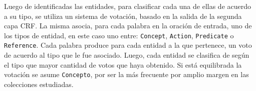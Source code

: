 Luego de identificadas las entidades, para clasificar cada una de ellas de acuerdo a su tipo, se utiliza un sistema de votaci\'on, basado en la salida de la segunda capa CRF.
La misma asocia, para cada palabra en la oración de entrada, uno de los tipos de entidad, en este caso uno entre: \texttt{Concept}, \texttt{Action}, \texttt{Predicate} o \texttt{Reference}.
Cada palabra produce para cada entidad a la que pertenece, un voto de acuerdo al tipo que le fue asociado.
Luego, cada entidad se clasifica de según el tipo que mayor cantidad de votos que haya obtenido. Si está equilibrada la votación se asume \texttt{Concepto}, por ser la más frecuente por amplio margen en las colecciones estudiadas.



















